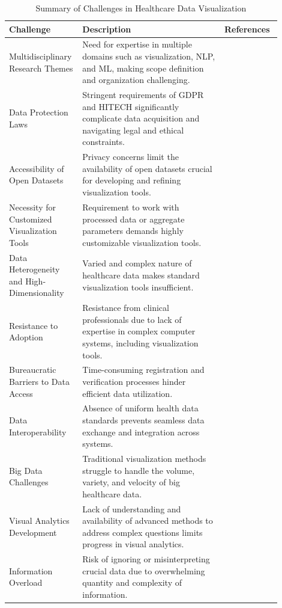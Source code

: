 \begin{table}[ht]
\caption{Summary of Challenges in Healthcare Data Visualization}
\label{tab:healthcare-challenges}
\centering
\begin{tabular}{|p{0.2\linewidth}|p{0.5\linewidth}|p{0.2\linewidth}|}
\hline
\textbf{Challenge} & \textbf{Description} & \textbf{References} \\ \hline
Multidisciplinary Research Themes & Need for expertise in multiple domains such as visualization, NLP, and ML, making scope definition and organization challenging. & \cite{soa9} \\ \hline
Data Protection Laws & Stringent requirements of GDPR and HITECH significantly complicate data acquisition and navigating legal and ethical constraints. & \cite{soa11, soa10} \\ \hline
Accessibility of Open Datasets & Privacy concerns limit the availability of open datasets crucial for developing and refining visualization tools. & \cite{soa9} \\ \hline
Necessity for Customized Visualization Tools & Requirement to work with processed data or aggregate parameters demands highly customizable visualization tools. & \cite{soa12, soa13} \\ \hline
Data Heterogeneity and High-Dimensionality & Varied and complex nature of healthcare data makes standard visualization tools insufficient. & \cite{soa12, soa13} \\ \hline
Resistance to Adoption & Resistance from clinical professionals due to lack of expertise in complex computer systems, including visualization tools. & \cite{soa14} \\ \hline
Bureaucratic Barriers to Data Access & Time-consuming registration and verification processes hinder efficient data utilization. & \cite{soa15} \\ \hline
Data Interoperability & Absence of uniform health data standards prevents seamless data exchange and integration across systems. & \cite{soc21} \\ \hline
Big Data Challenges & Traditional visualization methods struggle to handle the volume, variety, and velocity of big healthcare data. & \cite{soa13} \\ \hline
Visual Analytics Development & Lack of understanding and availability of advanced methods to address complex questions limits progress in visual analytics. & \cite{soa17, soa18} \\ \hline
Information Overload & Risk of ignoring or misinterpreting crucial data due to overwhelming quantity and complexity of information. & \cite{soa19, soa20} \\ \hline
\end{tabular}
\end{table}


